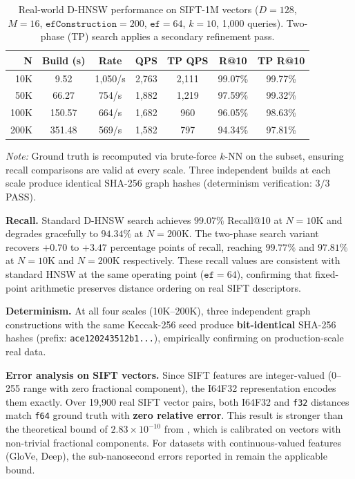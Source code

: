 \documentclass[10pt,journal]{IEEEtran}
\newcommand{\dhnsw}{\textsc{D-HNSW}}
\newcommand{\hnsw}{\textsc{HNSW}}
\begin{document}
\begin{table}[t]
  \centering
  \caption{Real-world \dhnsw{} performance on SIFT-1M vectors ($D{=}128$, $M{=}16$, $\texttt{efConstruction}{=}200$, $\texttt{ef}{=}64$, $k{=}10$, 1{,}000 queries). Two-phase (TP) search applies a secondary refinement pass.}
  \label{tab:real_sift}
  \begin{tabular}{rcccccc}
    \toprule
    \textbf{N} & \textbf{Build (s)} & \textbf{Rate} & \textbf{QPS} & \textbf{TP QPS} & \textbf{R@10} & \textbf{TP R@10} \\
    \midrule
    10K   & 9.52   & 1{,}050/s & 2{,}763 & 2{,}111 & 99.07\% & 99.77\% \\
    50K   & 66.27  & 754/s     & 1{,}882 & 1{,}219 & 97.59\% & 99.32\% \\
    100K  & 150.57 & 664/s     & 1{,}682 & 960     & 96.05\% & 98.63\% \\
    200K  & 351.48 & 569/s     & 1{,}582 & 797     & 94.34\% & 97.81\% \\
    \bottomrule
  \end{tabular}
  \vspace{1mm}
  {\footnotesize \emph{Note:} Ground truth is recomputed via brute-force $k$-NN on the subset, ensuring recall comparisons are valid at every scale. Three independent builds at each scale produce identical SHA-256 graph hashes (determinism verification: $3/3$ PASS).}
\end{table}

\textbf{Recall.} Standard \dhnsw{} search achieves $99.07\%$ Recall@10 at $N{=}10$K and degrades gracefully to $94.34\%$ at $N{=}200$K. The two-phase search variant recovers $+0.70$ to $+3.47$ percentage points of recall, reaching $99.77\%$ and $97.81\%$ at $N{=}10$K and $N{=}200$K respectively. These recall values are consistent with standard \hnsw{} at the same operating point ($\texttt{ef}{=}64$), confirming that fixed-point arithmetic preserves distance ordering on real SIFT descriptors.

\textbf{Determinism.} At all four scales (10K--200K), three independent graph constructions with the same Keccak-256 seed produce \textbf{bit-identical} SHA-256 hashes (prefix: \texttt{ace120243512b1...}), empirically confirming  on production-scale real data.

\textbf{Error analysis on SIFT vectors.} Since SIFT features are integer-valued (0--255 range with zero fractional component), the I64F32 representation encodes them exactly. Over 19{,}900 real SIFT vector pairs, both I64F32 and \texttt{f32} distances match \texttt{f64} ground truth with \textbf{zero relative error}. This result is stronger than the theoretical bound of $2.83 \times 10^{-10}$ from , which is calibrated on vectors with non-trivial fractional components. For datasets with continuous-valued features (GloVe, Deep), the sub-nanosecond errors reported in  remain the applicable bound.
\end{document}
